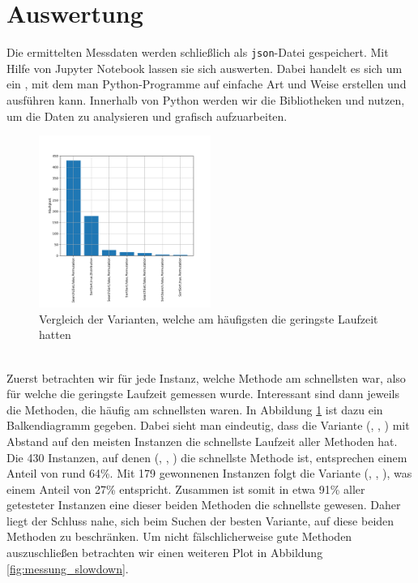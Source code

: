 \section{Auswertung}
Die ermittelten Messdaten werden schließlich als \texttt{json}-Datei gespeichert. Mit Hilfe von 
Jupyter Notebook \cite{jupyter} lassen sie sich auswerten. Dabei
handelt es sich um ein , mit dem man Python-Programme auf einfache Art und Weise erstellen und 
ausführen kann.
Innerhalb von Python werden wir die Bibliotheken  und  nutzen, um die Daten
zu analysieren und grafisch aufzuarbeiten.
\begin{figure}
\centering
	\includegraphics[width = 0.5\textwidth]{figures/counting.pdf}
	\caption{Vergleich der Varianten, welche am häufigsten die geringste Laufzeit hatten}
	\label{fig:messung_counting}
\end{figure}
\\
Zuerst betrachten wir für jede Instanz, welche Methode am schnellsten war, also für welche die geringste
Laufzeit gemessen wurde. Interessant sind dann jeweils die Methoden, die häufig am schnellsten waren.
In Abbildung \ref{fig:messung_counting} ist dazu ein Balkendiagramm gegeben.
Dabei sieht man eindeutig, dass die Variante (\SeaUSet, \false, \perm) mit Abstand 
auf den meisten Instanzen die schnellste Laufzeit aller Methoden hat. Die
430 Instanzen, auf denen (\SeaUSet, \false, \perm) die schnellste Methode ist, entsprechen einem Anteil von rund
64\%. Mit 179 \glqq gewonnenen\grqq{} Instanzen folgt die Variante (\SorSor, \true, \distr), was einem Anteil von
27\% entspricht. Zusammen ist somit in etwa 91\% aller getesteter Instanzen eine dieser beiden Methoden
die schnellste gewesen. Daher liegt der Schluss nahe, sich beim Suchen der \glqq besten\grqq{} Variante,
auf diese beiden Methoden zu beschränken. Um nicht fälschlicherweise \glqq gute\grqq{} Methoden auszuschließen
betrachten wir einen weiteren Plot in Abbildung \ref{fig:messung_slowdown}. 

